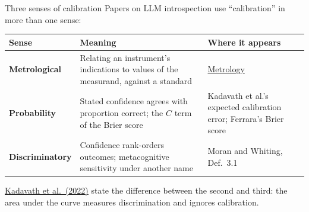 \documentclass[aspectratio=169,11pt]{beamer}
\newcommand{\site}{https://measuring-introspection.github.io/measuring-introspection}
\begin{document}
\begin{frame}[label=calsenses]{Three senses of calibration}
Papers on LLM introspection use ``calibration'' in more than one sense:

\vspace{0.2em}
\begin{center}
{\footnotesize\renewcommand{\arraystretch}{1.15}
\begin{tabular}{L{2.8cm}L{6.2cm}L{3.6cm}}
\toprule
\textbf{Sense} & \textbf{Meaning} & \textbf{Where it appears} \\
\midrule
\textcolor{state}{\textbf{Metrological}} & Relating an instrument's indications to values of the measurand, against a standard & \href{\site/foundations/metrology/}{Metrology} \\
\textcolor{bias}{\textbf{Probability}} & Stated confidence agrees with proportion correct; the $C$ term of the Brier score & Kadavath et al.'s expected calibration error; Ferrara's Brier score \\
\textcolor{report}{\textbf{Discriminatory}} & Confidence rank-orders outcomes; metacognitive sensitivity under another name & Moran and Whiting, Def.~3.1 \\
\bottomrule
\end{tabular}
}
\end{center}

\vspace{0.2em}
{\small \href{\site/papers/kadavath-2022/}{Kadavath et al.\ (2022)} state the difference between the second and third: the area under the curve measures discrimination and ignores calibration.}
\end{frame}
\end{document}
